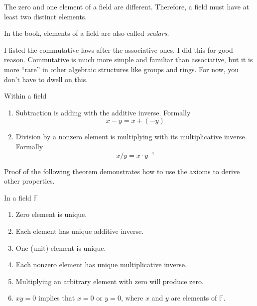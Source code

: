 \begin{note}
	The zero and one element of a field are different. Therefore, a field must have at least two distinct elements.

	In the book, elements of a field are also called \textit{scalars}.

	I listed the commutative laws after the associative ones. I did this for good reason. Commutative is much more simple and familiar than associative, but it is more ``rare'' in other algebraic structures like groups and rings. For now, you don't have to dwell on this.
\end{note}

\begin{definition}
	Within a field
	\begin{enumerate}
		\item Subtraction is adding with the additive inverse. Formally
		      \[
			      x - y = x + (-y)
		      \]
		\item Division by a nonzero element is multiplying with its multiplicative inverse. Formally
		      \[
			      x / y = x\cdot y^{-1}
		      \]
	\end{enumerate}
\end{definition}

Proof of the following theorem demonstrates how to use the axioms to derive other properties.

\begin{theorem}\label{thm:field-properties}
	In a field $\mathbb{F}$
	\begin{enumerate}[label = (\roman*)]
		\item Zero element is unique.
		\item Each element has unique additive inverse.
		\item One (unit) element is unique.
		\item Each nonzero element has unique multiplicative inverse.
		\item Multiplying an arbitrary element with zero will produce zero.
		\item $xy = 0$ implies that $x = 0$ or $y = 0$, where $x$ and $y$ are elements of $\mathbb{F}$.
	\end{enumerate}
\end{theorem}

